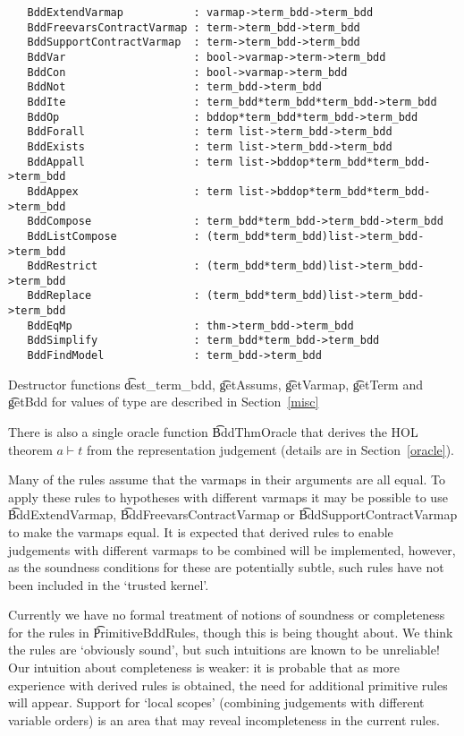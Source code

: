 {\footnotesize\baselineskip 10pt\begin{verbatim}
   BddExtendVarmap           : varmap->term_bdd->term_bdd
   BddFreevarsContractVarmap : term->term_bdd->term_bdd
   BddSupportContractVarmap  : term->term_bdd->term_bdd
   BddVar                    : bool->varmap->term->term_bdd
   BddCon                    : bool->varmap->term_bdd
   BddNot                    : term_bdd->term_bdd
   BddIte                    : term_bdd*term_bdd*term_bdd->term_bdd
   BddOp                     : bddop*term_bdd*term_bdd->term_bdd
   BddForall                 : term list->term_bdd->term_bdd
   BddExists                 : term list->term_bdd->term_bdd
   BddAppall                 : term list->bddop*term_bdd*term_bdd->term_bdd
   BddAppex                  : term list->bddop*term_bdd*term_bdd->term_bdd
   BddCompose                : term_bdd*term_bdd->term_bdd->term_bdd
   BddListCompose            : (term_bdd*term_bdd)list->term_bdd->term_bdd
   BddRestrict               : (term_bdd*term_bdd)list->term_bdd->term_bdd
   BddReplace                : (term_bdd*term_bdd)list->term_bdd->term_bdd
   BddEqMp                   : thm->term_bdd->term_bdd
   BddSimplify               : term_bdd*term_bdd->term_bdd
   BddFindModel              : term_bdd->term_bdd
\end{verbatim}}

Destructor functions \t{dest\_term\_bdd}, \t{getAssums}, \t{getVarmap}, \t{getTerm}
and \t{getBdd} for values of type \termbddty are described in Section~\ref{misc}

There is also a single oracle function
\t{BddThmOracle} that derives the HOL theorem $a \vdash t$
from the representation judgement 
(details are in Section~\ref{oracle}).

Many of the rules assume that the varmaps in their \termbddty
arguments are all equal. To apply these rules to hypotheses with
different varmaps it may be possible to use \t{BddExtendVarmap},
\t{BddFreevarsContractVarmap} or \t{BddSupportContractVarmap} to make
the varmaps equal.  It is expected that derived rules to enable
judgements with different varmaps to be combined will be implemented,
however, as the soundness conditions for these are potentially subtle,
such rules have not been included in the `trusted kernel'.

Currently we have no formal treatment of notions of soundness or
completeness for the rules in \t{PrimitiveBddRules}, though this is
being thought about. We think the rules are `obviously sound', but
such intuitions are known to be unreliable! Our intuition about
completeness is weaker: it is probable that as more experience with
derived rules is obtained, the need for additional primitive rules
will appear. Support for `local scopes' (combining judgements with
different variable orders) is an area that may reveal incompleteness
in the current rules.

